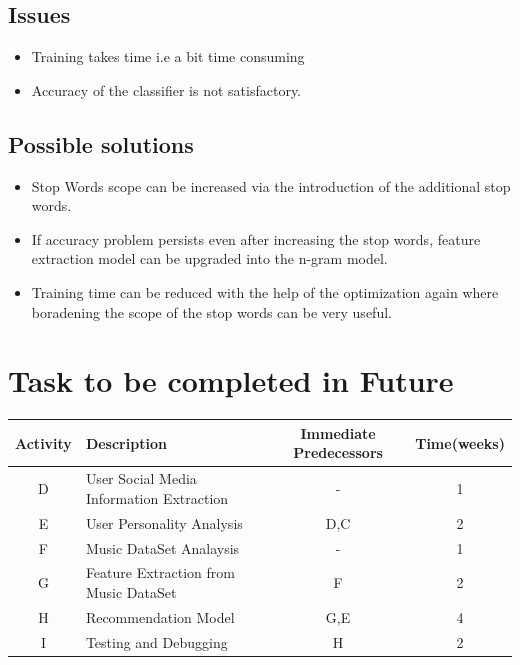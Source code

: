 \documentclass[a4paper, 12pt, onepage]{article}
\begin{document}
      \subsection{Issues}
      \begin{itemize}
      \item Training takes time i.e a bit time consuming
	\item Accuracy of the classifier is not satisfactory.
	\end{itemize}
      \subsection{Possible solutions}
      \begin{itemize}
	\item Stop Words scope can be increased via the introduction of the additional stop words.
	\item If accuracy problem persists even after increasing the stop words, feature extraction model can be upgraded into the n-gram model.
	\item Training time can be reduced with the help of the optimization again where boradening the scope of the stop words can be very useful.
	\end{itemize}
      \clearpage
      \section{Task to be completed in Future}
	\begin{center}
		\begin{tabular}{|c|l|c|c|}
			\hline
				Activity & Description & Immediate Predecessors&Time(weeks)\\
			\hline
			D&User Social Media Information Extraction&-&1\\
			\hline
			E&User Personality Analysis&D,C&2\\
			\hline
			F&Music DataSet Analaysis&-&1 \\
			\hline
			G&Feature Extraction from Music DataSet&F&2\\
			\hline
			H&Recommendation Model&G,E&4\\
			\hline
			I&Testing and Debugging&H&2\\
			\hline
		\end{tabular}
	\end{center}
\end{document}

